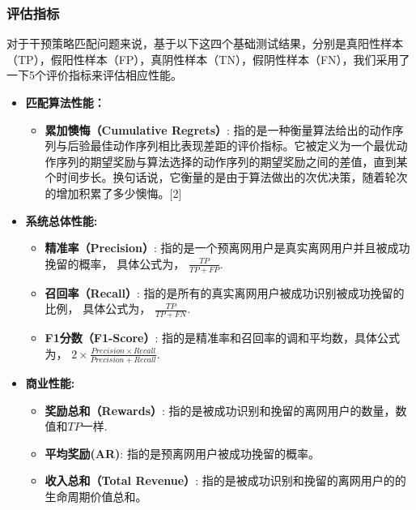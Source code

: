 \subsubsection{评估指标}
对于干预策略匹配问题来说，基于以下这四个基础测试结果，分别是真阳性样本（TP），假阳性样本（FP），真阴性样本（TN），假阴性样本（FN），我们采用了一下5个评价指标来评估相应性能。
\begin{itemize}
	\item \textbf{匹配算法性能：}
	
	\begin{itemize}
		\item \textbf{累加懊悔（Cumulative Regrets）}: 指的是一种衡量算法给出的动作序列与后验最佳动作序列相比表现差距的评价指标。它被定义为一个最优动作序列的期望奖励与算法选择的动作序列的期望奖励之间的差值，直到某个时间步长。换句话说，它衡量的是由于算法做出的次优决策，随着轮次的增加积累了多少懊悔。[2]
		
	\end{itemize}
	
	\item \textbf{系统总体性能:}
	\begin{itemize}
		
		\item \textbf{精准率（Precision）}: 指的是一个预离网用户是真实离网用户并且被成功挽留的概率， 具体公式为， $\frac{TP}{TP+FP}$.
		
		\item \textbf{召回率（Recall）}: 指的是所有的真实离网用户被成功识别被成功挽留的比例， 具体公式为， $\frac{TP}{TP+FN}$.
		
		\item \textbf{F1分数（F1-Score）}: 指的是精准率和召回率的调和平均数，具体公式为， $2 \times \frac{Precision \times Recall}{Precision + Recall}$.
	\end{itemize}
	
	\item \textbf{商业性能:}
	\begin{itemize}
		\item \textbf{奖励总和（Rewards）}: 指的是被成功识别和挽留的离网用户的数量，数值和$TP$一样.
		
		\item \textbf{平均奖励(AR)}: 指的是预离网用户被成功挽留的概率。
		
		\item \textbf{收入总和（Total Revenue）}: 指的是被成功识别和挽留的离网用户的的生命周期价值总和。
	\end{itemize}
	
\end{itemize}

